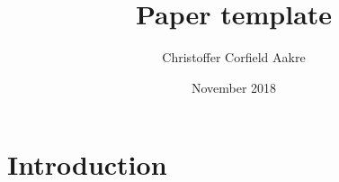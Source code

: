 \documentclass{paper}
\title{Paper template}
\author{Christoffer Corfield Aakre}
\date{November 2018}
\begin{document}
\maketitles

\section{Introduction}
\cite{inverse-square}

\printbibliography
\end{document}
